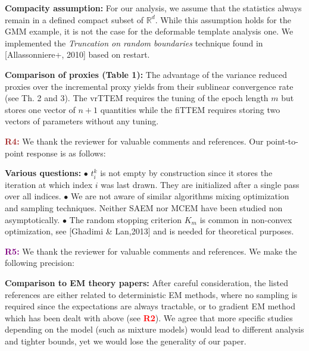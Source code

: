 \documentclass{article}
\begin{document}
\textbf{Compacity assumption:}  
For our analysis, we assume that the statistics always remain in a defined compact subset of $\mathbb{R}^d$.
While this assumption holds for the GMM example, it is not the case for the deformable template analysis one.
We implemented the \emph{Truncation on random boundaries} technique found in [Allassonniere+, 2010] based on restart.\vspace{-5pt}

\textbf{Comparison of proxies (Table 1):} 
The advantage of the variance reduced proxies over the incremental proxy yields from their sublinear convergence rate (see Th. 2 and 3). 
The vrTTEM requires the tuning of the epoch length $m$ but stores one vector of $n+1$ quantities while the fiTTEM requires storing two vectors of parameters without any tuning.

\textbf{\textcolor{brown}{R4:}} We thank the reviewer for valuable comments and references. Our point-to-point response is as follows:\vspace{-5pt}

\textbf{Various questions:} $\bullet$ $t_i^k$ is not empty by construction since it stores the iteration at which index $i$ was last drawn. 
They are initialized after a single pass over all indices.
$\bullet$ We are not aware of similar algorithms mixing optimization and sampling techniques. 
Neither SAEM nor MCEM have been studied non asymptotically.
$\bullet$ The random stopping criterion $K_m$ is common in non-convex optimization, see [Ghadimi \& Lan,2013] and is needed for theoretical purposes.


\textbf{\textcolor{purple}{R5:}} We thank the reviewer for valuable comments and references. We make the following precision:\vspace{-5pt}

\textbf{Comparison to EM theory papers:}
After careful consideration, the listed references are either related to deterministic EM methods, where no sampling is required since the expectations are always tractable, or to gradient EM method which has been dealt with above (see \textbf{\textcolor{red}{R2}}).
We agree that more specific studies depending on the model (such as mixture models) would lead to different analysis and tighter bounds, yet we would lose the generality of our paper.\vspace{-5pt}
\end{document}

